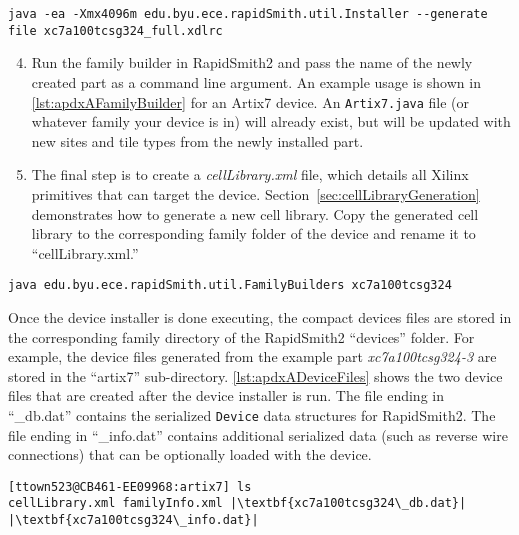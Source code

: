 \begin{lstlisting}[numbers=none, caption=RapidSmith2 device installer example
usage, label=lst:apdxAInstaller] 
java -ea -Xmx4096m edu.byu.ece.rapidSmith.util.Installer --generate file xc7a100tcsg324_full.xdlrc
\end{lstlisting}

\begin{enumerate}
\setcounter{enumi}{3}
\item Run the family builder in RapidSmith2 and pass the name of the newly
created part as a command line argument. An example usage is shown in
\autoref{lst:apdxAFamilyBuilder} for an Artix7 device. An \texttt{Artix7.java}
file (or whatever family your device is in) will already exist, but will be
updated with new sites and tile types from the newly installed part.

\item The final step is to create a \textit{cellLibrary.xml} file, which details
all Xilinx primitives that can target the device. Section~\ref{sec:cellLibraryGeneration}
demonstrates how to generate a new cell library. Copy the generated cell library
to the corresponding family folder of the device and rename it to
``cellLibrary.xml.''

\end{enumerate}

\begin{lstlisting}[numbers=none, caption=Family builder example usage,
label=lst:apdxAFamilyBuilder] 
java edu.byu.ece.rapidSmith.util.FamilyBuilders xc7a100tcsg324
\end{lstlisting}

\vspace{.3cm}

\noindent Once the device installer is done executing, the compact devices files
are stored in the corresponding family directory of the RapidSmith2 ``devices''
folder. For example, the device files generated from the example part
\textit{xc7a100tcsg324-3} are stored in the ``artix7'' sub-directory.
\autoref{lst:apdxADeviceFiles} shows the two device files that are created
after the device installer is run. The file ending in ``\_db.dat'' contains the
serialized \texttt{Device} data structures for RapidSmith2. The file ending in
``\_info.dat'' contains additional serialized data (such as reverse wire
connections) that can be optionally loaded with the device.

\begin{lstlisting}[numbers=none, caption=Generated RapidSmith2 device files,
label=lst:apdxADeviceFiles] 
[ttown523@CB461-EE09968:artix7] ls
cellLibrary.xml familyInfo.xml |\textbf{xc7a100tcsg324\_db.dat}| |\textbf{xc7a100tcsg324\_info.dat}|
\end{lstlisting} 

